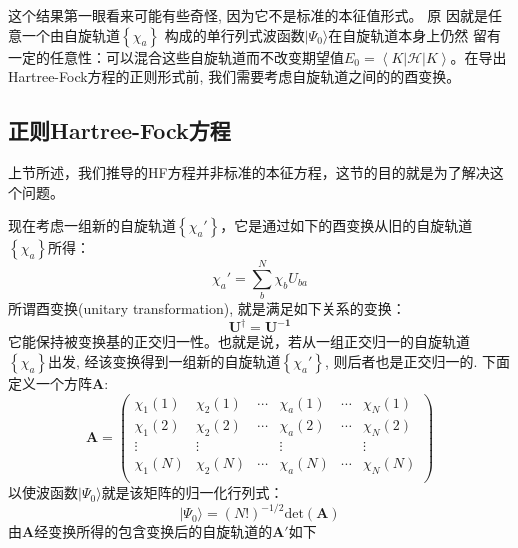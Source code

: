 \documentclass[]{article}
\begin{document}
这个结果第一眼看来可能有些奇怪, 因为它不是标准的本征值形式。 原
因就是任意一个由自旋轨道$\left\lbrace \chi_a\right\rbrace $ 构成的单行列式波函数$|\Psi_0\rangle$在自旋轨道本身上仍然
留有一定的任意性：可以混合这些自旋轨道而不改变期望值$E_0=\left\langle K|\mathscr{H}|K \right\rangle $。在导出
Hartree-Fock方程的正则形式前, 我们需要考虑自旋轨道之间的的酉变换。
\subsection{正则Hartree-Fock方程}
上节所述，我们推导的HF方程并非标准的本征方程，这节的目的就是为了解决这个问题。

现在考虑一组新的自旋轨道$\left\lbrace \chi_a'\right\rbrace $，它是通过如下的酉变换从旧的自旋轨道$\left\lbrace \chi_a\right\rbrace $所得：
\begin{equation}
	\chi_a'=\sum\limits_b^N\chi_bU_{ba}
\end{equation}
所谓酉变换(unitary transformation), 就是满足如下关系的变换：
\begin{equation}
	\mathbf{U^{\dagger}}=\mathbf{U^{-1}}
\end{equation}
它能保持被变换基的正交归一性。也就是说，若从一组正交归一的自旋轨道 $\left\lbrace \chi_a\right\rbrace $出发, 经该变换得到一组新的自旋轨道$\left\lbrace \chi_a'\right\rbrace $, 则后者也是正交归一的. 下面定义一个方阵$\mathbf{A}$:
\begin{equation}
	\mathbf{A}=\begin{pmatrix}
		\chi_1(1)&\chi_2(1)&\cdots&\chi_a(1)&\cdots&\chi_N(1)\\
		\chi_1(2)&\chi_2(2)&\cdots&\chi_a(2)&\cdots&\chi_N(2)\\
		\vdots	 &\vdots   &	  &\vdots   &      &\vdots\\
		\chi_1(N)&\chi_2(N)&\cdots&\chi_a(N)&\cdots&\chi_N(N)\\
	\end{pmatrix}
\end{equation}
以使波函数$|\Psi_0\rangle$就是该矩阵的归一化行列式：
\begin{equation}
	|\Psi_0\rangle=(N!)^{-1/2}\mathrm{det}(\mathbf{A})
\end{equation}
由$\mathbf{A}$经变换所得的包含变换后的自旋轨道的$\mathbf{A'}$如下
\end{document}
